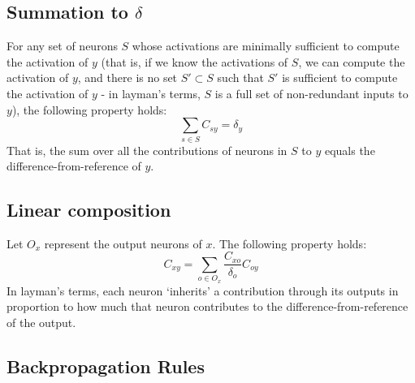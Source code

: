 \documentclass{article}
\begin{document}
\subsection{Summation to $\delta$}

For any set of neurons $S$ whose activations are minimally sufficient to compute the activation of $y$ (that is, if we know the activations of $S$, we can compute the activation of $y$, and there is no set $S' \subset S$ such that $S'$ is sufficient to compute the activation of $y$ - in layman's terms, $S$ is a full set of non-redundant inputs to $y$), the following property holds:
\begin{equation}
\sum_{s \in S} C_{sy} = \delta_y
\end{equation}
That is, the sum over all the contributions of neurons in $S$ to $y$ equals the difference-from-reference of $y$.

\subsection{Linear composition}

Let $O_x$ represent the output neurons of $x$. The following property holds:\\
\begin{equation}
C_{xy} = \sum_{o \in O_x} \frac{C_{xo}}{\delta_o}C_{oy}
\end{equation}
In layman's terms, each neuron `inherits' a contribution through its outputs in proportion to how much that neuron contributes to the difference-from-reference of the output.

\subsection{Backpropagation Rules}
\end{document}
